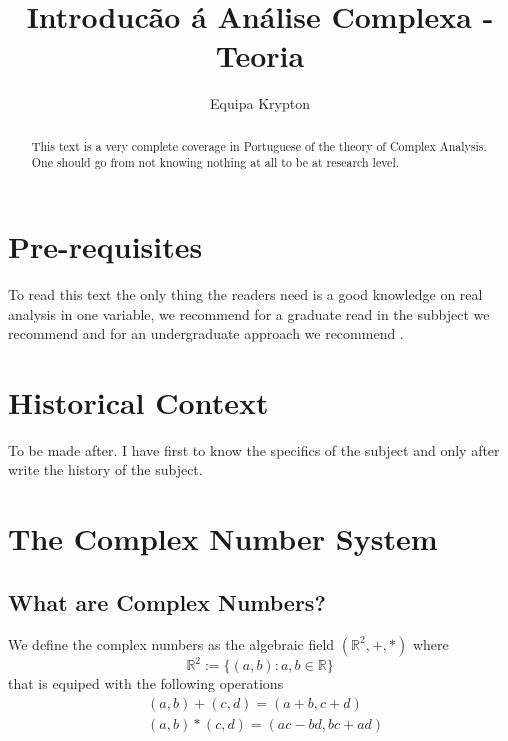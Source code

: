 \documentclass{article}
\title{Introducão á Análise Complexa - Teoria}
\author{Equipa Krypton}
\begin{document}


\maketitle

\begin{abstract}
    This text is a very complete coverage in Portuguese of the theory of Complex Analysis.
    One should go from not knowing nothing at all to be at research level.
\end{abstract}

\section{Pre-requisites}
To read this text the only thing the readers need is a good knowledge on real analysis in
one variable, we recommend for a graduate read in the subbject we recommend \cite{rudin_principles_1976}
and for an undergraduate approach we recommend \cite{abbott_understanding_2015}.

\section{Historical Context}
To be made after. I have first to know the specifics of the subject and only after
write the history of the subject.

\section{The Complex Number System}

\subsection{What are Complex Numbers?}

\begin{definition}
    We define the complex numbers as the algebraic field $(\mathbb{R}^2,+,*)$ where
    $$
    \mathbb{R}^2 := \{(a,b) : a,b \in \mathbb{R}\}
    $$
    that is equiped with the following operations
    \begin{align*}
        & (a,b) + (c,d) = (a+b,c+d) \\
        & (a,b) * (c,d) = (ac-bd,bc+ad)
    \end{align*}
\end{definition}
\end{document}
